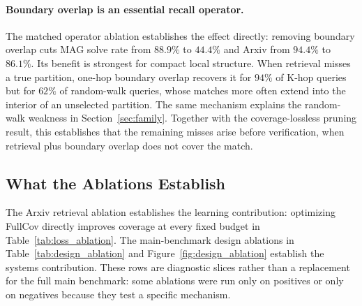 \documentclass[runningheads]{llncs}
\begin{document}
\paragraph{Boundary overlap is an essential recall operator.}
The matched operator ablation establishes the effect directly: removing boundary overlap cuts MAG solve rate from $88.9\%$ to $44.4\%$ and Arxiv from $94.4\%$ to $86.1\%$. Its benefit is strongest for compact local structure. When retrieval misses a true partition, one-hop boundary overlap recovers it for $94\%$ of K-hop queries but for $62\%$ of random-walk queries, whose matches more often extend into the interior of an unselected partition. The same mechanism explains the random-walk weakness in Section~\ref{sec:family}. Together with the coverage-lossless pruning result, this establishes that the remaining misses arise before verification, when retrieval plus boundary overlap does not cover the match.

\subsection{What the Ablations Establish}

The Arxiv retrieval ablation establishes the learning contribution: optimizing FullCov directly improves coverage at every fixed budget in Table~\ref{tab:loss_ablation}. The main-benchmark design ablations in Table~\ref{tab:design_ablation} and Figure~\ref{fig:design_ablation} establish the systems contribution. These rows are diagnostic slices rather than a replacement for the full main benchmark: some ablations were run only on positives or only on negatives because they test a specific mechanism.
\end{document}
